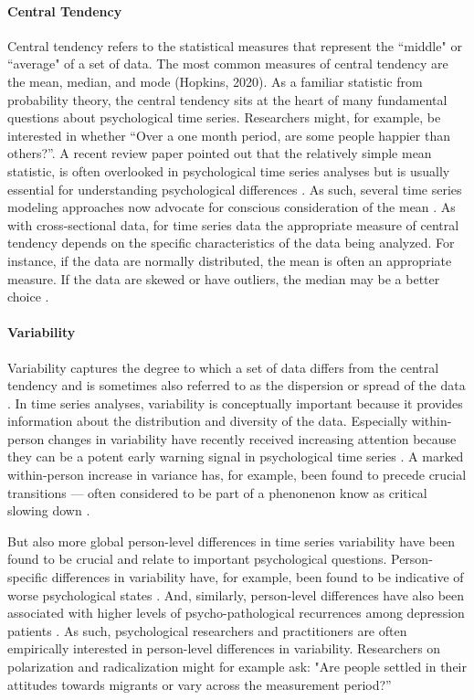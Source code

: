\documentclass[man, 12pt, a4paper, mask, floatsintext]{apa7}
\theoremstyle{break}
\theoremstyle{plain}
\begin{document}
\paragraph{Central Tendency} Central tendency refers to the statistical measures that represent the ``middle" or ``average" of a set of data. The most common measures of central tendency are the mean, median, and mode (Hopkins, 2020). As a familiar statistic from probability theory, the central tendency sits at the heart of many fundamental questions about psychological time series. Researchers might, for example, be interested in whether ``Over a one month period, are some people happier than others?''. A recent review paper pointed out that the relatively simple mean statistic, is often overlooked in psychological time series analyses but is usually essential for understanding psychological differences \citep{bringmann2018c}. As such, several time series modeling approaches now advocate for conscious consideration of the mean \citep[e.g.,][]{bringmann2017a}. As with cross-sectional data, for time series data the appropriate measure of central tendency depends on the specific characteristics of the data being analyzed. For instance, if the data are normally distributed, the mean is often an appropriate measure. If the data are skewed or have outliers, the median may be a better choice \citep{weisberg1992}.

\paragraph{Variability} Variability captures the degree to which a set of data differs from the central tendency and is sometimes also referred to as the dispersion or spread of the data \citep{weisberg1992}. In time series analyses, variability is conceptually important because it provides information about the distribution and diversity of the data. Especially within-person changes in variability have recently received increasing attention because they can be a potent early warning signal in psychological time series \citep{helmich2020a, vandeleemput2014}. A marked within-person increase in variance has, for example, been found to precede crucial transitions --- often considered to be part of a phenonenon know as critical slowing down \citep[i.e., anomalous variances; e.g.,][]{scheffer2009, wichers2019}. 

But also more global person-level differences in time series variability have been found to be crucial and relate to important psychological questions. Person-specific differences in variability have, for example, been found to be indicative of worse psychological states \citep{myin-germeys2018}. And, similarly, person-level differences have also been associated with higher levels of psycho-pathological recurrences among depression patients \citep{timm2017}. As such, psychological researchers and practitioners are often empirically interested in person-level differences in variability. Researchers on polarization and radicalization might for example ask: "Are people settled in their attitudes towards migrants or vary across the measurement period?''
\end{document}

